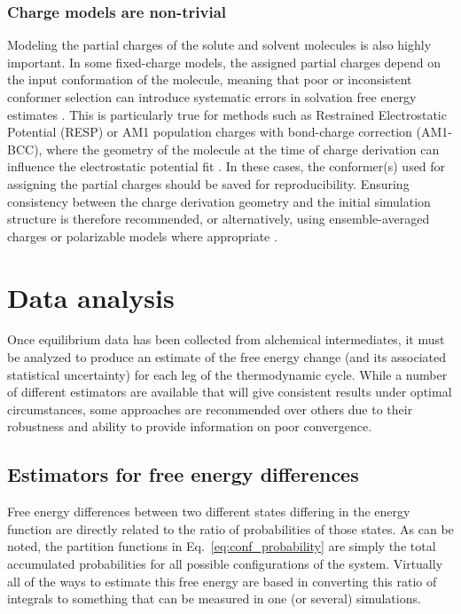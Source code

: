 \documentclass[9pt,bestpractices]{livecoms}
\begin{document}
\subsubsection{Charge models are non-trivial}
Modeling the partial charges of the solute and solvent molecules is also highly important. In some fixed-charge models, the assigned partial charges depend on the input conformation of the molecule, meaning that poor or inconsistent conformer selection can introduce systematic errors in solvation free energy estimates \cite{jakalian2000, jambeck2003}. This is particularly true for methods such as Restrained Electrostatic Potential (RESP)\cite{bayly1993resp} or AM1 population charges with bond-charge correction (AM1-BCC)\cite{jakalian2000}, where the geometry of the molecule at the time of charge derivation can influence the electrostatic potential fit \cite{basma2001, zhang2011, dupradeau2010, osato2025}. In these cases, the conformer(s) used for assigning the partial charges should be saved for reproducibility. Ensuring consistency between the charge derivation geometry and the initial simulation structure is therefore recommended, or alternatively, using ensemble-averaged charges or polarizable models where appropriate \cite{ren2002,lemkul2016}.

\section{Data analysis}
\label{sec:data_analysis}
Once equilibrium data has been collected from alchemical intermediates, it must be analyzed to produce an estimate of the free energy change (and its associated statistical uncertainty) for each leg of the thermodynamic cycle.
While a number of different estimators are available that will give consistent results under optimal circumstances, some approaches are recommended over others due to their robustness and ability to provide information on poor convergence.

\subsection{Estimators for free energy differences}
\label{subsec:estimators}
Free energy differences between two different states differing in the energy function are directly related to the
ratio of probabilities of those states.
As can be noted, the partition functions in Eq.~\ref{eq:conf_probability} are simply the total accumulated probabilities for all possible configurations of the system. Virtually all of the ways to estimate this free energy are based in converting this ratio of integrals to something that can be measured in one (or several) simulations.  
\end{document}
